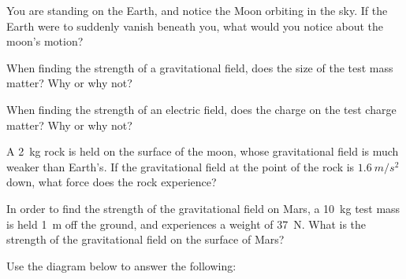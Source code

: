 \documentclass[12pt]{exam}
\begin{document}
\begin{questions}
\clearpage
\question You are standing on the Earth, and notice the Moon orbiting in the sky. If the Earth were to suddenly vanish beneath you, what would you notice about the moon's motion?
\vspace{1in}

\question When finding the strength of a gravitational field, does the size of the test mass matter? Why or why not?
\vspace{1in}

\question When finding the strength of an electric field, does the charge on the test charge matter? Why or why not?
\vspace{1in}

\question A 2~kg rock is held on the surface of the moon, whose gravitational field is much weaker than Earth's. If the gravitational field at the point of the rock is $1.6~m/s^2$ down, what force does the rock experience?
\vspace{1in}

\question In order to find the strength of the gravitational field on Mars, a 10~kg test mass is held 1~m off the ground, and experiences a weight of 37~N. What is the strength of the gravitational field on the surface of Mars?
\vspace{1in}

\clearpage
\question Use the diagram below to answer the following:


\end{questions}
\end{document}
